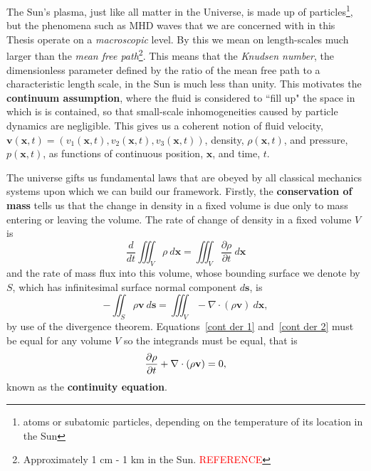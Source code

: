 \documentclass[12pt]{../style-files/ociamthesis}
\begin{document}
The Sun's plasma, just like all matter in the Universe, is made up of particles\footnote{atoms or subatomic particles, depending on the temperature of its location in the Sun}, but the phenomena such as MHD waves that we are concerned with in this Thesis operate on a \textit{macroscopic} level. By this we mean on length-scales much larger than the \textit{mean free path}\footnote{Approximately 1 cm - 1 km in the Sun. \textcolor{red}{REFERENCE}}. This means that the \textit{Knudsen number}, the dimensionless parameter defined by the ratio of the mean free path to a characteristic length scale, in the Sun is much less than unity. This motivates the \textbf{continuum assumption}, where the fluid is considered to ``fill up" the space in which is is contained, so that small-scale inhomogeneities caused by particle dynamics are negligible. This gives us a coherent notion of fluid velocity, $\mathbf{v}(\mathbf{x}, t) = (v_1(\mathbf{x}, t), v_2(\mathbf{x}, t), v_3(\mathbf{x}, t))$, density, $\rho(\mathbf{x}, t)$, and pressure, $p(\mathbf{x}, t)$, as functions of continuous position, $\mathbf{x}$, and time, $t$.

The universe gifts us fundamental laws that are obeyed by all classical mechanics systems upon which we can build our framework. Firstly, the \textbf{conservation of mass} tells us that the change in density in a fixed volume is due only to mass entering or leaving the volume. The rate of change of density in a fixed volume $V$ is
\begin{equation}
	\frac{d}{dt} \iiint_V \rho ~d\mathbf{x} = \iiint_V \frac{\partial\rho}{\partial t} ~d\mathbf{x} \label{cont der 1}
\end{equation}
and the rate of mass flux into this volume, whose bounding surface we denote by $S$, which has infinitesimal surface normal component $d\mathbf{s}$, is
\begin{equation}
	-\iint_S \rho \mathbf{v} ~d\mathbf{s} = \iiint_V -\nabla\cdot(\rho\mathbf{v}) ~d\mathbf{x}, \label{cont der 2}
\end{equation}
by use of the divergence theorem. Equations~\eqref{cont der 1} and~\eqref{cont der 2} must be equal for any volume $V$ so the integrands must be equal, that is
\begin{equation}
	\frac{\partial\rho}{\partial t} + \nabla\cdot(\rho \mathbf{v}) = 0, \label{cont eqn}
\end{equation}
known as the \textbf{continuity equation}.
\end{document}
